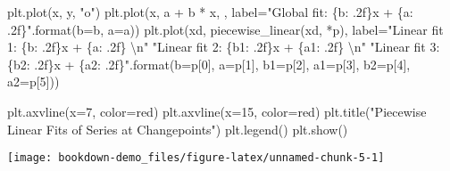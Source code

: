 \documentclass[]{tufte-book}
\newenvironment{Shaded}{}{}
\newcommand{\BuiltInTok}[1]{#1}
\newcommand{\CharTok}[1]{\textcolor[rgb]{0.25,0.44,0.63}{#1}}
\newcommand{\DecValTok}[1]{\textcolor[rgb]{0.25,0.63,0.44}{#1}}
\newcommand{\NormalTok}[1]{#1}
\newcommand{\OperatorTok}[1]{\textcolor[rgb]{0.40,0.40,0.40}{#1}}
\newcommand{\SpecialCharTok}[1]{\textcolor[rgb]{0.25,0.44,0.63}{#1}}
\newcommand{\StringTok}[1]{\textcolor[rgb]{0.25,0.44,0.63}{#1}}
\theoremstyle{definition}
\theoremstyle{definition}
\theoremstyle{definition}
\theoremstyle{remark}
\begin{document}
\begin{Shaded}
\begin{Highlighting}[]
\NormalTok{plt.plot(x, y, }\StringTok{"o"}\NormalTok{)}
\NormalTok{plt.plot(x, a }\OperatorTok{+}\NormalTok{ b }\OperatorTok{*}\NormalTok{ x, }\StringTok{\textquotesingle{}{-}{-}\textquotesingle{}}\NormalTok{, label}\OperatorTok{=}\StringTok{"Global fit: }\SpecialCharTok{\{b: .2f\}}\StringTok{x + }\SpecialCharTok{\{a: .2f\}}\StringTok{"}\NormalTok{.}\BuiltInTok{format}\NormalTok{(b}\OperatorTok{=}\NormalTok{b, a}\OperatorTok{=}\NormalTok{a))}
\NormalTok{plt.plot(xd, piecewise\_linear(xd, }\OperatorTok{*}\NormalTok{p), }
\NormalTok{label}\OperatorTok{=}\StringTok{"Linear fit 1: }\SpecialCharTok{\{b: .2f\}}\StringTok{x + }\SpecialCharTok{\{a: .2f\}}\StringTok{ }\CharTok{\textbackslash{}n}\StringTok{"}
\StringTok{"Linear fit 2: }\SpecialCharTok{\{b1: .2f\}}\StringTok{x + }\SpecialCharTok{\{a1: .2f\}}\StringTok{ }\CharTok{\textbackslash{}n}\StringTok{"}
\StringTok{"Linear fit 3: }\SpecialCharTok{\{b2: .2f\}}\StringTok{x + }\SpecialCharTok{\{a2: .2f\}}\StringTok{"}\NormalTok{.}\BuiltInTok{format}\NormalTok{(b}\OperatorTok{=}\NormalTok{p[}\DecValTok{0}\NormalTok{], a}\OperatorTok{=}\NormalTok{p[}\DecValTok{1}\NormalTok{],}
\NormalTok{b1}\OperatorTok{=}\NormalTok{p[}\DecValTok{2}\NormalTok{], a1}\OperatorTok{=}\NormalTok{p[}\DecValTok{3}\NormalTok{], b2}\OperatorTok{=}\NormalTok{p[}\DecValTok{4}\NormalTok{], a2}\OperatorTok{=}\NormalTok{p[}\DecValTok{5}\NormalTok{]))}
                                                                              
\NormalTok{plt.axvline(x}\OperatorTok{=}\DecValTok{7}\NormalTok{, color}\OperatorTok{=}\StringTok{\textquotesingle{}red\textquotesingle{}}\NormalTok{)}
\NormalTok{plt.axvline(x}\OperatorTok{=}\DecValTok{15}\NormalTok{, color}\OperatorTok{=}\StringTok{\textquotesingle{}red\textquotesingle{}}\NormalTok{)}
\NormalTok{plt.title(}\StringTok{"Piecewise Linear Fits of Series at Changepoints"}\NormalTok{)}
\NormalTok{plt.legend()}
\NormalTok{plt.show()}
\end{Highlighting}
\end{Shaded}

\texttt{[image: bookdown-demo\_files/figure-latex/unnamed-chunk-5-1]}
\end{document}
